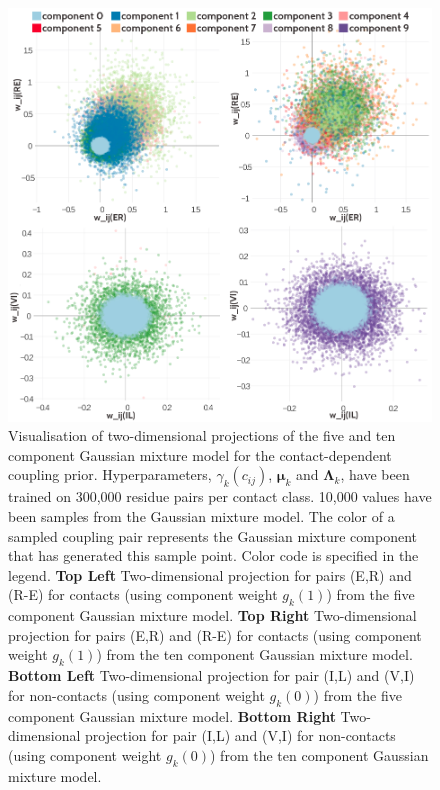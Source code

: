 \documentclass[11pt,a4paper,twoside]{book}
\newcommand{\Lk}{\mathbf{\Lambda}_k}
\newcommand{\muk}{\mathbf{\mu}_k}
\newcommand{\cij}{c_{ij}}
\theoremstyle{definition}
\theoremstyle{definition}
\theoremstyle{remark}
\begin{document}
\begin{figure}
\includegraphics[width=1\linewidth]{img/bayesian_model/pll/2dvis_combined_5comp_10comp_300k} \caption{Visualisation of two-dimensional
projections of the five and ten component Gaussian mixture model for the
contact-dependent coupling prior. Hyperparameters, \(\gamma_k(\cij)\),
\(\muk\) and \(\Lk\), have been trained on 300,000 residue pairs per
contact class. 10,000 values have been samples from the Gaussian mixture
model. The color of a sampled coupling pair represents the Gaussian
mixture component that has generated this sample point. Color code is
specified in the legend. \textbf{Top Left} Two-dimensional projection
for pairs (E,R) and (R-E) for contacts (using component weight
\(g_k(1)\)) from the five component Gaussian mixture model. \textbf{Top
Right} Two-dimensional projection for pairs (E,R) and (R-E) for contacts
(using component weight \(g_k(1)\)) from the ten component Gaussian
mixture model. \textbf{Bottom Left} Two-dimensional projection for pair
(I,L) and (V,I) for non-contacts (using component weight \(g_k(0)\))
from the five component Gaussian mixture model. \textbf{Bottom Right}
Two-dimensional projection for pair (I,L) and (V,I) for non-contacts
(using component weight \(g_k(0)\)) from the ten component Gaussian
mixture model.}\label{fig:vis2d-pll-5-10-comp-300k}
\end{figure}
\end{document}
